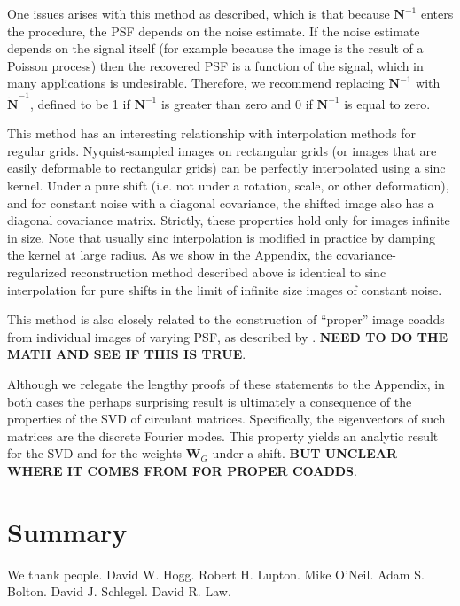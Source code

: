 \documentclass[twocolumn,tighten]{aastex61}
\begin{document}
One issues arises with this method as described, which is that because
$\mathbf{N}^{-1}$ enters the procedure, the PSF depends on the noise
estimate. If the noise estimate depends on the signal itself (for
example because the image is the result of a Poisson process) then the
recovered PSF is a function of the signal, which in many applications
is undesirable. Therefore, we recommend replacing $\mathbf{N}^{-1}$ with
$\mathbf{\tilde N}^{-1}$, defined to be 1 if $\mathbf{N}^{-1}$ is
greater than zero and 0 if $\mathbf{N}^{-1}$ is equal to zero.

This method has an interesting relationship with interpolation methods
for regular grids. Nyquist-sampled images on rectangular grids (or
images that are easily deformable to rectangular grids) can be
perfectly interpolated using a sinc kernel. Under a pure shift
(i.e. not under a rotation, scale, or other deformation), and for
constant noise with a diagonal covariance, the shifted image also has
a diagonal covariance matrix. Strictly, these properties hold only for
images infinite in size.  Note that usually sinc interpolation is
modified in practice by damping the kernel at large radius. As we show
in the Appendix, the covariance-regularized reconstruction method
described above is identical to sinc interpolation for pure shifts in
the limit of infinite size images of constant noise.

This method is also closely related to the construction of ``proper''
image coadds from individual images of varying PSF, as described by
\citet{zackay17a}. {\bf NEED TO DO THE MATH AND SEE IF THIS IS TRUE}.

Although we relegate the lengthy proofs of these statements to the
Appendix, in both cases the perhaps surprising result is ultimately a
consequence of the properties of the SVD of circulant
matrices. Specifically, the eigenvectors of such matrices are the
discrete Fourier modes. This property yields an analytic result for
the SVD and for the weights $\mathbf{W}_G$ under a shift.  {\bf BUT
  UNCLEAR WHERE IT COMES FROM FOR PROPER COADDS}.

\section{Summary}
\label{sec:summary}

\acknowledgments

We thank people. David W. Hogg. Robert H. Lupton. Mike O'Neil. Adam
S. Bolton. David J. Schlegel. David R. Law.
\end{document}
